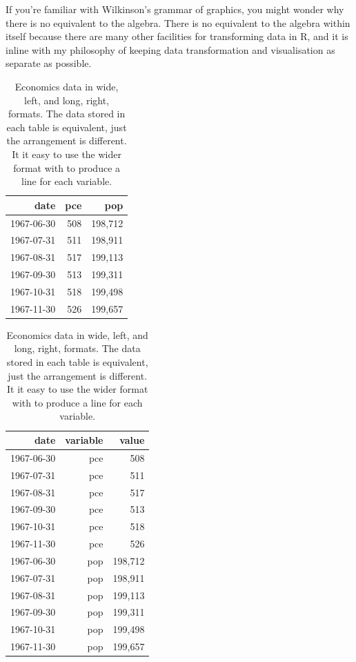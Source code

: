 If you're familiar with Wilkinson's grammar of graphics, you might wonder why there is no equivalent to the algebra.  There is no equivalent to the algebra within \ggplot itself because there are many other facilities for transforming data in R, and it is inline with my philosophy of keeping data transformation and visualisation as separate as possible.


\begin{table}[ht]
  \centering
  \begin{minipage}[t]{0.4\linewidth}
  \begin{tabular}{rrr}
    \toprule
    date & pce & pop \\
    \midrule
    1967-06-30 & 508 & 198,712 \\
    1967-07-31 & 511 & 198,911 \\
    1967-08-31 & 517 & 199,113 \\
    1967-09-30 & 513 & 199,311 \\
    1967-10-31 & 518 & 199,498 \\
    1967-11-30 & 526 & 199,657 \\
    \bottomrule
  \end{tabular}
  \end{minipage}
  \hspace{0.5cm}
  \begin{minipage}[t]{0.4\linewidth}
  \begin{tabular}{rrr}
    \toprule
    date & variable & value \\
    \midrule
    1967-06-30 & pce &     508 \\
    1967-07-31 & pce &     511 \\
    1967-08-31 & pce &     517 \\
    1967-09-30 & pce &     513 \\
    1967-10-31 & pce &     518 \\
    1967-11-30 & pce &     526 \\
    1967-06-30 & pop & 198,712 \\
    1967-07-31 & pop & 198,911 \\
    1967-08-31 & pop & 199,113 \\
    1967-09-30 & pop & 199,311 \\
    1967-10-31 & pop & 199,498 \\
    1967-11-30 & pop & 199,657 \\
    \midrule
  \end{tabular}
  \end{minipage}

  \caption{Economics data in wide, left, and long, right, formats.  The data stored in each table is equivalent, just the arrangement is different.  It it easy to use the wider format with \ggplot to produce a line for each variable.}
  \label{tbl:melt}
\end{table}

